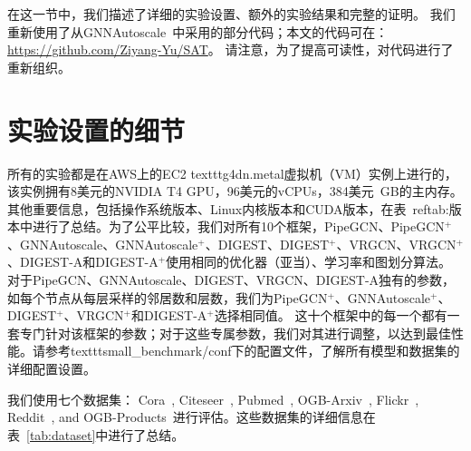 在这一节中，我们描述了详细的实验设置、额外的实验结果和完整的证明。
我们重新使用了从GNNAutoscale~\cite{fey2021gnnautoscale}中采用的部分代码；本文的代码可在： \url{https://github.com/Ziyang-Yu/SAT}。
请注意，为了提高可读性，对代码进行了重新组织。 

\section*{实验设置的细节}


所有的实验都是在AWS上的EC2 {texttt{g4dn.metal}}虚拟机（VM）实例上进行的，该实例拥有8美元的NVIDIA T4 GPU，96美元的vCPUs，384美元~GB的主内存。其他重要信息，包括操作系统版本、Linux内核版本和CUDA版本，在表~ref{tab:版本}中进行了总结。为了公平比较，我们对所有10个框架，PipeGCN、PipeGCN$^{+}$、GNNAutoscale、GNNAutoscale$^{+}$、DIGEST、DIGEST$^{+}$、VRGCN、VRGCN$^{+}$、DIGEST-A和DIGEST-A$^{+}$使用相同的优化器（亚当）、学习率和图划分算法。
对于PipeGCN、GNNAutoscale、DIGEST、VRGCN、DIGEST-A独有的参数，如每个节点从每层采样的邻居数和层数，我们为PipeGCN$^{+}$、GNNAutoscale$^{+}$、DIGEST$^{+}$、VRGCN$^{+}$和DIGEST-A$^{+}$选择相同值。
这十个框架中的每一个都有一套专门针对该框架的参数；对于这些专属参数，我们对其进行调整，以达到最佳性能。请参考texttt{small\_benchmark/conf}下的配置文件，了解所有模型和数据集的详细配置设置。

我们使用七个数据集： Cora~\cite{sen2008collective}, Citeseer~\cite{sen2008collective}, Pubmed~\cite{sen2008collective}, OGB-Arxiv~\cite{hu2020open}, Flickr~\cite{zeng2019graphsaint}, Reddit~\cite{zeng2019graphsaint}, and OGB-Products~\cite{hu2020open}进行评估。这些数据集的详细信息在表~\ref{tab:dataset}中进行了总结。


\begin{table}[h]
    \centering
    \caption{我们测试平台的环境设置概要}
    \label{tab:versions}
\end{table}




